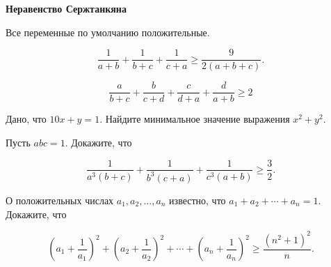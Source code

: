 \centerline{\bf \Huge Неравенство Сержтанкяна}


\begin{flushright}
        \scriptsize{Все переменные по умолчанию положительные.}
\end{flushright}

$$
\dfrac{1}{a+b}+\dfrac{1}{b+c}+\dfrac{1}{c+a} \geqslant \dfrac{9}{2(a+b+c)} .
$$


$$
\dfrac{a}{b+c}+\dfrac{b}{c+d}+\dfrac{c}{d+a}+\dfrac{d}{a+b} \geqslant 2
$$

Дано, что $10 x+y=1$. Найдите минимальное значение выражения $x^2+y^2$.

Пусть $a b c=1$. Докажите, что

$$
\dfrac{1}{a^3(b+c)}+\dfrac{1}{b^3(c+a)}+\dfrac{1}{c^3(a+b)} \geqslant \dfrac{3}{2} .
$$


О положительных числах $a_1, a_2, \ldots, a_n$ известно, что $a_1+a_2+\cdots+a_n=1$. Докажите, что

$$
\left(a_1+\dfrac{1}{a_1}\right)^2+\left(a_2+\dfrac{1}{a_2}\right)^2+\cdots+\left(a_n+\dfrac{1}{a_n}\right)^2 \geqslant \dfrac{\left(n^2+1\right)^2}{n} .
$$